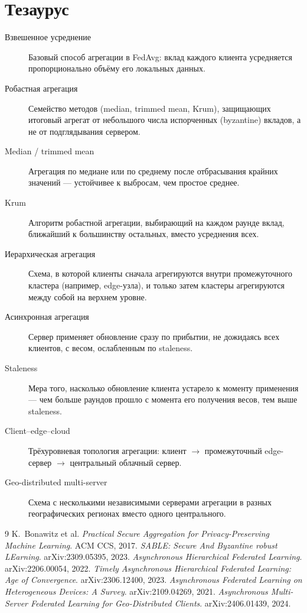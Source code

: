 \documentclass[11pt]{article}
\begin{document}
\section{Тезаурус}

\begin{description}
  \item[Взвешенное усреднение] Базовый способ агрегации в FedAvg: вклад каждого
    клиента усредняется пропорционально объёму его локальных данных.
  \item[Робастная агрегация] Семейство методов (median, trimmed mean, Krum),
    защищающих итоговый агрегат от небольшого числа испорченных (byzantine)
    вкладов, а не от подглядывания сервером.
  \item[Median / trimmed mean] Агрегация по медиане или по среднему после отбрасывания
    крайних значений — устойчивее к выбросам, чем простое среднее.
  \item[Krum] Алгоритм робастной агрегации, выбирающий на каждом раунде вклад,
    ближайший к большинству остальных, вместо усреднения всех.
  \item[Иерархическая агрегация] Схема, в которой клиенты сначала агрегируются внутри
    промежуточного кластера (например, edge-узла), и только затем кластеры
    агрегируются между собой на верхнем уровне.
  \item[Асинхронная агрегация] Сервер применяет обновление сразу по прибытии, не
    дожидаясь всех клиентов, с весом, ослабленным по staleness.
  \item[Staleness] Мера того, насколько обновление клиента \guillemotleft
    устарело\guillemotright{} к моменту применения — чем больше раундов прошло с
    момента его получения весов, тем выше staleness.
  \item[Client--edge--cloud] Трёхуровневая топология агрегации: клиент $\to$
    промежуточный edge-сервер $\to$ центральный облачный сервер.
  \item[Geo-distributed multi-server] Схема с несколькими независимыми серверами
    агрегации в разных географических регионах вместо одного центрального.
\end{description}

\begin{thebibliography}{9}
 K.~Bonawitz et al. \emph{Practical Secure Aggregation for
  Privacy-Preserving Machine Learning}. ACM CCS, 2017.
 \emph{SABLE: Secure And Byzantine robust LEarning}.
  arXiv:2309.05395, 2023.
 \emph{Asynchronous Hierarchical Federated Learning}.
  arXiv:2206.00054, 2022.
 \emph{Timely Asynchronous Hierarchical Federated
  Learning: Age of Convergence}. arXiv:2306.12400, 2023.
 \emph{Asynchronous Federated Learning on Heterogeneous
  Devices: A Survey}. arXiv:2109.04269, 2021.
 \emph{Asynchronous Multi-Server Federated Learning for
  Geo-Distributed Clients}. arXiv:2406.01439, 2024.
\end{thebibliography}
\end{document}
